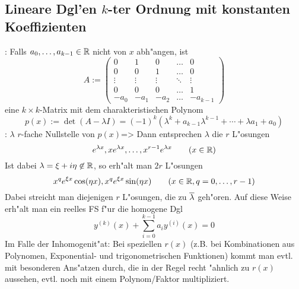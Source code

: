 \subsection{Lineare Dgl'en $k$-ter Ordnung mit konstanten Koeffizienten}
\remark:{
  Falls $a_0,\ldots,a_{k-1}\in\mathbb R$ nicht von $x$ abh"angen, ist
  \[A:=\begin{pmatrix}
      0 & 1 & 0 & \dots & 0 \\
      0 & 0 & 1 & \dots & 0 \\
      \vdots & \vdots & \vdots & \ddots & \vdots \\
      0 & 0 & 0 & \dots & 1 \\
      -a_0 & -a_1 & -a_2 & \dots & -a_{k-1}
      \end{pmatrix}
    \]
  eine $k\times k$-Matrix mit dem charakteristischen Polynom
  \[p(x):=\det(A-\lambda I)=(-1)^k(\lambda^k+a_{k-1}\lambda^{k-1}+\cdots+\lambda a_1+a_0)
    \]
  }
\theorem:
  $\lambda$ $r$-fache Nullstelle von $p(x)$=>{
  Dann entsprechen $\lambda$ die $r$ L"osungen
  \[e^{\lambda x},xe^{\lambda x},\dots,x^{r-1}e^{\lambda x}\qquad (x\in\mathbb R)
    \]
  Ist dabei $\lambda=\xi+i\eta\not\in\mathbb R$, so erh"alt man $2r$ L"osungen
  \[x^qe^{\xi x}\cos(\eta x),x^qe^{\xi x}\sin(\eta x)
    \qquad (x\in\mathbb R,q=0,\ldots,r-1)
    \]
  Dabei streicht man diejenigen $r$ L"osungen, die zu $\overline{\lambda}$
  geh"oren. Auf diese Weise erh"alt man ein reelles FS f"ur die
  homogene Dgl
  \[y^{(k)}(x)+\sum_{i=0}^{k-1}a_iy^{(i)}(x)=0
    \]
  }
\remark Im Falle der Inhomogenit"at:{
  Bei speziellen $r(x)$ (z.B. bei Kombinationen aus Polynomen,
  Exponential- und trigonometrischen Funktionen)
  kommt man evtl. mit besonderen Ans"atzen durch,
  die in der Regel recht "ahnlich zu $r(x)$ aussehen, evtl. noch mit
  einem Polynom/Faktor multipliziert.
  }
